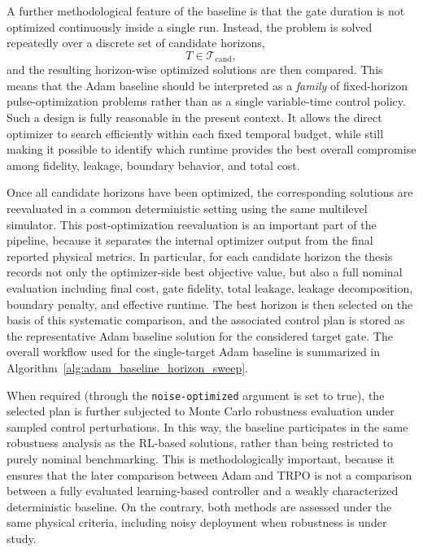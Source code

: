 A further methodological feature of the baseline is that the gate duration is not optimized continuously inside a single run. Instead, the problem is solved repeatedly over a discrete set of candidate horizons,
\begin{equation}
T \in \mathcal{T}_{\mathrm{cand}},
\label{eq:adam_candidate_horizons}
\end{equation}
and the resulting horizon-wise optimized solutions are then compared. This means that the Adam baseline should be interpreted as a \emph{family} of fixed-horizon pulse-optimization problems rather than as a single variable-time control policy. Such a design is fully reasonable in the present context. It allows the direct optimizer to search efficiently within each fixed temporal budget, while still making it possible to identify which runtime provides the best overall compromise among fidelity, leakage, boundary behavior, and total cost.

Once all candidate horizons have been optimized, the corresponding solutions are reevaluated in a common deterministic setting using the same multilevel simulator. This post-optimization reevaluation is an important part of the pipeline, because it separates the internal optimizer output from the final reported physical metrics. In particular, for each candidate horizon the thesis records not only the optimizer-side best objective value, but also a full nominal evaluation including final cost, gate fidelity, total leakage, leakage decomposition, boundary penalty, and effective runtime. The best horizon is then selected on the basis of this systematic comparison, and the associated control plan is stored as the representative Adam baseline solution for the considered target gate.
The overall workflow used for the single-target Adam baseline is summarized in Algorithm~\ref{alg:adam_baseline_horizon_sweep}.

When required (through the \texttt{noise-optimized} argument is set to true), the selected plan is further subjected to Monte Carlo robustness evaluation under sampled control perturbations. In this way, the baseline participates in the same robustness analysis as the RL-based solutions, rather than being restricted to purely nominal benchmarking. This is methodologically important, because it ensures that the later comparison between Adam and TRPO is not a comparison between a fully evaluated learning-based controller and a weakly characterized deterministic baseline. On the contrary, both methods are assessed under the same physical criteria, including noisy deployment when robustness is under study.

